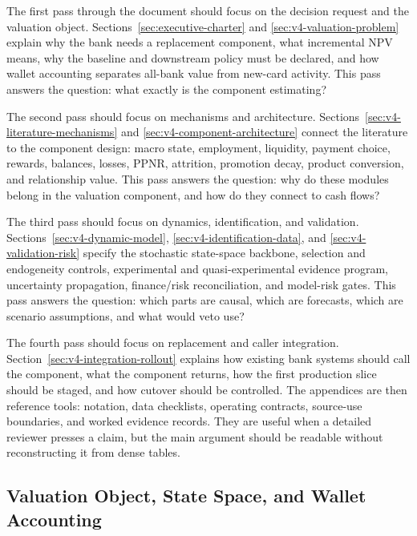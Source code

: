 \documentclass[11pt]{article}
\newcommand{\1}{\mathbf{1}}
\begin{document}
The first pass through the document should focus on the decision request and
the valuation object. Sections~\ref{sec:executive-charter} and
\ref{sec:v4-valuation-problem} explain why the bank needs a replacement
component, what incremental NPV means, why the baseline and downstream policy
must be declared, and how wallet accounting separates all-bank value from
new-card activity. This pass answers the question: what exactly is the
component estimating?

The second pass should focus on mechanisms and architecture.
Sections~\ref{sec:v4-literature-mechanisms} and
\ref{sec:v4-component-architecture} connect the literature to the component
design: macro state, employment, liquidity, payment choice, rewards, balances,
losses, PPNR, attrition, promotion decay, product conversion, and relationship
value. This pass answers the question: why do these modules belong in the
valuation component, and how do they connect to cash flows?

The third pass should focus on dynamics, identification, and validation.
Sections~\ref{sec:v4-dynamic-model}, \ref{sec:v4-identification-data}, and
\ref{sec:v4-validation-risk} specify the stochastic state-space backbone,
selection and endogeneity controls, experimental and quasi-experimental
evidence program, uncertainty propagation, finance/risk reconciliation, and
model-risk gates. This pass answers the question: which parts are causal,
which are forecasts, which are scenario assumptions, and what would veto use?

The fourth pass should focus on replacement and caller integration.
Section~\ref{sec:v4-integration-rollout} explains how existing bank systems
should call the component, what the component returns, how the first production
slice should be staged, and how cutover should be controlled. The appendices
are then reference tools: notation, data checklists, operating contracts,
source-use boundaries, and worked evidence records. They are useful when a
detailed reviewer presses a claim, but the main argument should be readable
without reconstructing it from dense tables.

\subsection{Valuation Object, State Space, and Wallet Accounting}
\label{sec:valuation-spine}
\end{document}
